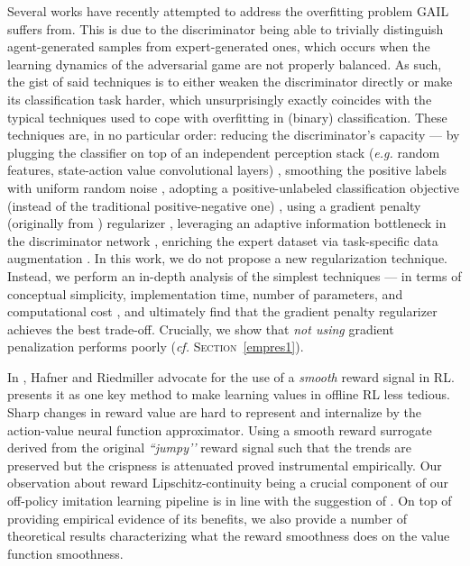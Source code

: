 Several works have recently attempted to address the overfitting problem GAIL suffers from.
This is due to the discriminator being able to trivially distinguish agent-generated samples
from expert-generated ones, which occurs when the learning dynamics of the adversarial
game are not properly balanced.
As such, the gist of said techniques is to either weaken the discriminator directly or
make its classification task harder,
which unsurprisingly exactly coincides with the typical techniques used to cope with
overfitting in (binary) classification.
These techniques are, in no particular order:
reducing the discriminator's capacity
--- by plugging the classifier on top of an
independent perception stack
(\textit{e.g.} random features, state-action value convolutional layers) \cite{Reed2018-ga},
smoothing the positive labels with uniform random noise \cite{Blonde2019-vc},
adopting a positive-unlabeled classification objective
(instead of the traditional positive-negative one) \cite{Xu2019-uo},
using a gradient penalty (originally from \cite{Gulrajani2017-mr}) regularizer
\cite{Blonde2019-vc,Kostrikov2019-jo},
leveraging an adaptive information bottleneck in the discriminator network
\cite{Peng2018-mo},
enriching the expert dataset via task-specific data augmentation \cite{Zolna2019-wj}.
In this work,
we do not propose a new regularization technique.
Instead, we perform an in-depth analysis of the simplest
techniques
--- in terms of conceptual simplicity, implementation time,
number of parameters, and computational cost \cite{Hernandez2020-dv},
and ultimately find that the gradient penalty regularizer
achieves the best trade-off.
Crucially, we show
that \emph{not using} gradient penalization performs poorly
(\textit{cf.} \textsc{Section}~\ref{empres1}).

In \cite{Hafner2011-rv}, Hafner and Riedmiller
advocate for the use of a \emph{smooth} reward signal in RL.
\cite{Lange2012-cc} presents it as one key method to make learning values in offline RL less tedious.
Sharp changes in reward value are hard
to represent and internalize by the action-value neural function approximator.
Using a smooth reward surrogate
derived from the original \textit{``jumpy’’} reward signal such that the trends are preserved
but the crispness is attenuated proved instrumental empirically.
Our observation about reward Lipschitz-continuity being a crucial component of our
off-policy imitation learning pipeline is in line with the suggestion of \cite{Hafner2011-rv}.
On top of providing empirical evidence of its benefits,
we also provide a number of theoretical results characterizing
what the reward smoothness does on the value function smoothness.

